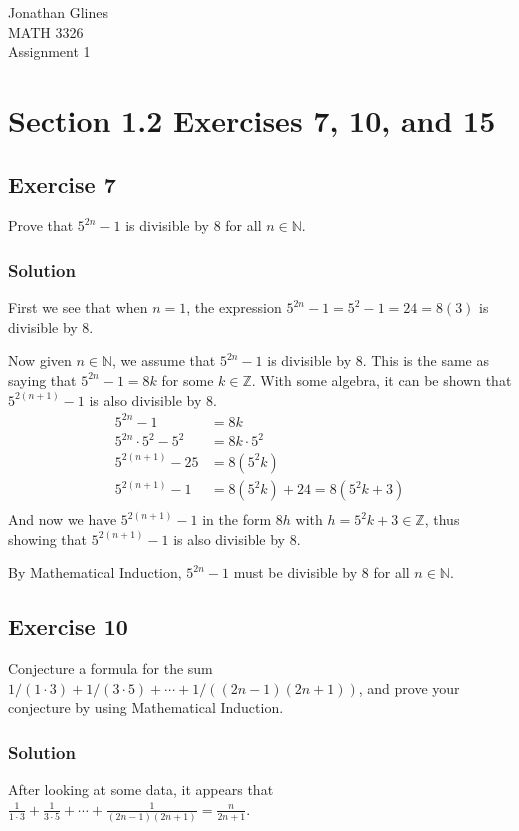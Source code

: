 \documentclass[12pt]{article}
\begin{document}
\begin{flushright}
{\Large
Jonathan Glines \\
MATH 3326 \\
Assignment 1 \\
}
\end{flushright}
\section*{Section 1.2 Exercises 7, 10, and 15}
\subsection*{Exercise 7}
Prove that $5^{2n} - 1$ is divisible by 8 for all $n \in \mathbb{N}$.
\subsubsection*{Solution}
First we see that when $n = 1$, the expression $5^{2n} - 1 = 5^2 - 1 = 24 = 8(3)$ is divisible by 8.

Now given $n \in \mathbb{N}$, we assume that $5^{2n} - 1$ is divisible by 8. This is the same as saying that $5^{2n} - 1 = 8k$ for some $k \in \mathbb{Z}$. With some algebra, it can be shown that $5^{2\left(n + 1\right)} - 1$ is also divisible by 8.
\begin{align*}
5^{2n} - 1 &= 8k \\
5^{2n} \cdot 5^2 - 5^2 &= 8k \cdot 5^2 \\
5^{2\left(n + 1\right)} - 25 &= 8\left(5^2 k\right) \\
5^{2\left(n + 1\right)} - 1 &= 8\left(5^2 k\right) + 24 = 8\left(5^2 k + 3\right) \\
\end{align*}
And now we have $5^{2\left(n + 1\right)} - 1$ in the form $8h$ with $h = 5^2 k + 3 \in \mathbb{Z}$, thus showing that $5^{2\left(n + 1\right)} - 1$ is also divisible by 8.

By Mathematical Induction, $5^{2n} - 1$ must be divisible by 8 for all $n \in \mathbb{N}$.

\subsection*{Exercise 10}
Conjecture a formula for the sum $1/\left(1\cdot 3\right) + 1/\left(3 \cdot 5\right) + \cdots + 1 /\left(\left(2n - 1\right)\left(2n+1\right)\right)$, and prove your conjecture by using Mathematical Induction.
\subsubsection*{Solution}
After looking at some data, it appears that $\frac{1}{1 \cdot 3} + \frac{1}{3 \cdot 5} + \cdots + \frac{1}{\left(2n - 1\right)\left(2n + 1\right)} = \frac{n}{2n + 1}$.
\end{document}
